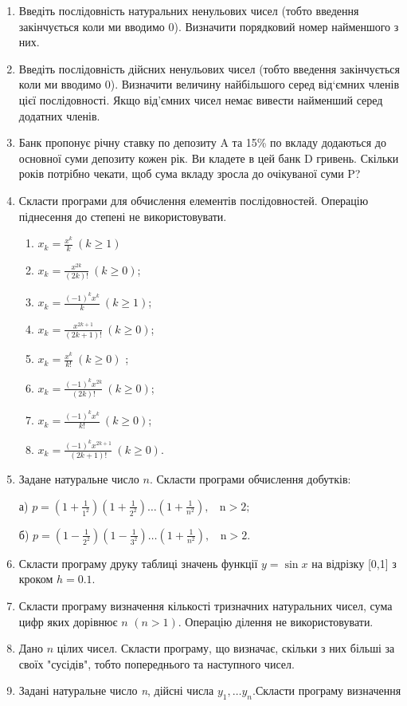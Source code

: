 \documentclass[a5paper,titlepage,openany,twoside,draft]{book_unv}%
\makeatletter
\newcommand{\xslalph}[1]{\expandafter\@xslalph\csname c@#1\endcsname}
\newcommand{\@xslalph}[1]{%
    \ifcase#1\or а\or б\or в\or г\or д\or e\or є\or ж\or з\or i%
    \or й\or к\or л\or м\or н\or о\or п\or р\or с\or т%
    \or у\or ф\or х\or ц\or ч\or ш\or ю\or я\or аа\or бб\or вв%
    \else\@ctrerr\fi%
}
\makeatother
\begin{document}
\begin{enumerate}
\item
  Введіть послідовність натуральних ненульових чисел (тобто введення
  закінчується коли ми вводимо 0). Визначити порядковий номер найменшого
  з них.
\item
  Введіть послідовність дійсних ненульових чисел (тобто введення
  закінчується коли ми вводимо 0). Визначити величину найбільшого серед
  від`ємних членів цієї послідовності. Якщо від'ємних чисел немає
  вивести найменший серед додатних членів.
\item
  Банк пропонує річну ставку по депозиту A та 15\% по вкладу додаються
  до основної суми депозиту кожен рік. Ви кладете в цей банк D гривень.
  Скільки років потрібно чекати, щоб сума вкладу зросла до очікуваної
  суми P?
\item
  Скласти програми для обчислення елементів послідовностей. Операцію
  піднесення до степені не використовувати.
  \begin{multicols}{2}
\begin{enumerate}[label=\xslalph*)]
\item
\(x_{k} = \frac{x^{k}}{k}\ (k \geq 1)\) 
\item
\(x_{k} = \frac{x^{2k}}{(2k)!}\ (k \geq 0)\);
\item \(x_{k} = \frac{( - 1)^{k}x^{k}}{k}\ (k \geq 1)\); 
\item
\(x_{k} = \frac{x^{2k + 1}}{(2k + 1)!}\ (k \geq 0)\);
\item \(x_{k} = \frac{x^{k}}{k!}\ (k \geq 0)\) ;
\item \(x_{k} = \frac{(-1)^{k}x^{2k}}{(2k)!}\ (k \geq 0)\);
\item \(x_{k} = \frac{(-1)^{k}x^{k}}{k!}\ (k \geq 0)\); 
\item \(x_{k} = \frac{(-1)^{k}x^{2k + 1}}{(2k + 1)!}\ (k \geq  0)\).
 \end{enumerate}
  \end{multicols}
\item
  Задане натуральне число \(n\). Скласти програми обчислення добутків:

а)
\(p = \left( 1 + \frac{1}{1^{2}} \right)\left( 1 + \frac{1}{2^{2}} \right)\ldots\left( 1 + \frac{1}{n^{2}} \right),\mathrm{\ \ \ \ n > 2};\)

б)
\(p = \left( 1 - \frac{1}{2^{2}} \right)\left( 1 - \frac{1}{3^{2}} \right)\ldots\left( 1 + \frac{1}{n^{2}} \right),\mathrm{\ \ \ \ n > 2.}\)

\item
  Скласти програму друку таблиці значень функції \(y = \sin x\) на
  відрізку {[}0,1{]} з кроком \(h = 0.1\).
\item
  Скласти програму визначення кількості тризначних натуральних чисел,
  сума цифр яких дорівнює \(n\) \((n > 1)\). Операцію ділення не
  використовувати.
\item
  Дано \(n\) цілих чисел. Скласти програму, що визначає, скільки з
  них більші за своїх "сусідів", тобто попереднього та наступного чисел.
\item
  Задані натуральне число \emph{n}, дійсні числа
  \(y_{1},\ldots y_{n}.\)Скласти програму визначення


\end{enumerate}
\end{document}
